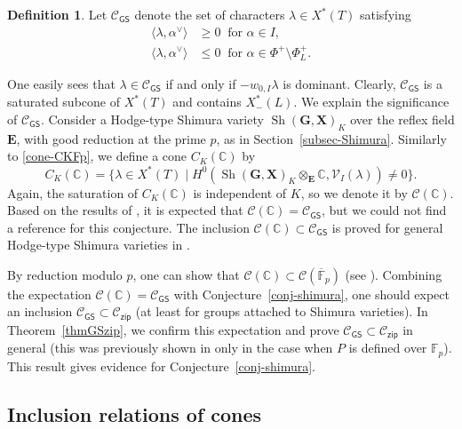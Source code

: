 \documentclass[11pt]{amsart}
\numberwithin{equation}{section}
\theoremstyle{definition}
\newtheorem{definition}[theorem]{Definition}
\theoremstyle{remark}
\newcommand{\zipsf}{\mathsf{zip}}
\newcommand{\GSsf}{\mathsf{GS}}
\newcommand{\Ccal}{{\mathcal C}}
\newcommand{\Vcal}{{\mathcal V}}
\newcommand{\CC}{\mathbb{C}}
\newcommand{\FF}{\mathbb{F}}
\DeclareMathOperator{\Sh}{Sh}
\newcommand{\shgx}{\Sh(\mathbf G, \mathbf X)}
\begin{document}
\begin{definition}\label{GSdef}
Let $\Ccal_{\GSsf}$ denote the set of characters $\lambda\in X^*(T)$ satisfying
\begin{align}
\langle \lambda, \alpha^\vee \rangle &\geq 0 \ \textrm{ for }\alpha\in I, \\
\langle \lambda, \alpha^\vee \rangle &\leq 0 \ \textrm{ for }\alpha\in \Phi^+ \setminus \Phi^{+}_{L}. 
\end{align}
\end{definition}
One easily sees that $\lambda\in \Ccal_{\GSsf}$ if and only if $-w_{0,I}\lambda$ is dominant. Clearly, $\Ccal_{\GSsf}$ is a saturated subcone of $X^*(T)$ and contains $X_{-}^*(L)$. We explain the significance of $\Ccal_{\GSsf}$. Consider a Hodge-type Shimura variety $\shgx_K$ over the reflex field $\mathbf{E}$, with good reduction at the prime $p$, as in Section~\ref{subsec-Shimura}. Similarly to \eqref{cone-CKFp}, we define a cone $C_K(\CC)$ by
\begin{equation}
C_K(\CC)=\{\lambda\in X^*(T) \mid H^0(\shgx_K\otimes_{\mathbf{E}} \CC,\Vcal_I(\lambda))\neq 0\}.
\end{equation}
Again, the saturation of $C_K(\CC)$ is independent of $K$, so we denote it by $\Ccal(\CC)$. Based on the results of \cite{Griffiths-Schmid-homogeneous-complex-manifolds}, it is expected that $\Ccal(\CC) =\Ccal_{\GSsf}$, but we could not find a reference for this conjecture. The inclusion $\Ccal(\CC) \subset \Ccal_{\GSsf}$ is proved for general Hodge-type Shimura varieties in \cite[Theorem 2.6.4]{Goldring-Koskivirta-GS-cone}.

By reduction modulo $p$, one can show that $\Ccal(\CC) \subset \Ccal(\overline{\FF}_p) $ (see \cite[Proposition 1.8.3]{Koskivirta-automforms-GZip}). Combining the expectation $\Ccal(\CC) =\Ccal_{\GSsf}$ with Conjecture~\ref{conj-shimura}, one should expect an inclusion $\Ccal_{\GSsf}\subset \Ccal_{\zipsf}$ (at least for groups attached to Shimura varieties). In Theorem~\ref{thmGSzip}, we confirm this expectation and prove $\Ccal_{\GSsf}\subset \Ccal_{\zipsf}$ in general (this was previously shown in \cite{Koskivirta-automforms-GZip} only in the case when $P$ is defined over $\FF_p$). This result gives evidence for Conjecture~\ref{conj-shimura}.


\subsection{Inclusion relations of cones}
\end{document}
